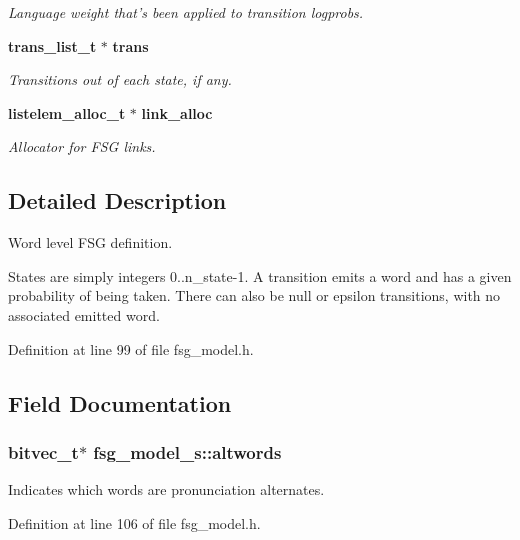 \begin{DoxyCompactItemize}
\begin{DoxyCompactList}\small\item\em Language weight that's been applied to transition logprobs. \end{DoxyCompactList}\item 
{\bf trans\-\_\-list\-\_\-t} $\ast$ {\bf trans}
\begin{DoxyCompactList}\small\item\em Transitions out of each state, if any. \end{DoxyCompactList}\item 
{\bf listelem\-\_\-alloc\-\_\-t} $\ast$ {\bf link\-\_\-alloc}
\begin{DoxyCompactList}\small\item\em Allocator for F\-S\-G links. \end{DoxyCompactList}\end{DoxyCompactItemize}


\subsection{Detailed Description}
Word level F\-S\-G definition. 

States are simply integers 0..n\-\_\-state-\/1. A transition emits a word and has a given probability of being taken. There can also be null or epsilon transitions, with no associated emitted word. 

Definition at line 99 of file fsg\-\_\-model.\-h.



\subsection{Field Documentation}
\subsubsection[{altwords}]{\setlength{\rightskip}{0pt plus 5cm}bitvec\-\_\-t$\ast$ fsg\-\_\-model\-\_\-s\-::altwords}\label{structfsg__model__s_adb51d840853d7ef3315bd833cddeb748}


Indicates which words are pronunciation alternates. 



Definition at line 106 of file fsg\-\_\-model.\-h.

